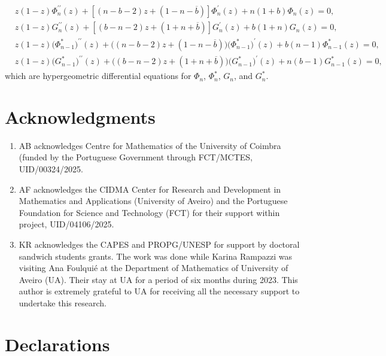 \documentclass[12pt]{amsart}
\begin{document}
\begin{align*}
&
z(1-z)\Phi_n^{\prime\prime}(z)+[(n-b-2)z+(1-n-\overline{b})]\Phi_n^{\prime}(z)+n(1+b)\Phi_n(z)=0,
 \\ 
&
z(1-z)G_n^{\prime\prime}(z)+[(b-n-2)z+(1+n+\overline{b})]G_n^{\prime}(z)+b(1+n)G_n(z)=0,\\
& 
 z(1-z) \big( \Phi_{n-1}^* \big)^{\prime\prime}(z)+\big((n-b-2)z+(1-n-\overline{b})\big) \big( \Phi_{n-1}^* \big)^{\prime}(z)+b(n-1)\Phi_{n-1}^*(z)=0,
 \\ 
&
 z(1-z) \big(G_{n-1}^*\big)^{\prime\prime}(z)+\big((b-n-2)z+(1+n+\overline{b})\big) \big( G_{n-1}^* \big)^{\prime}(z)+n(b-1)G_{n-1}^*(z)=0,
\end{align*}
which are hypergeometric differential equations for \( \Phi_n \), \( \Phi_n^* \), \( G_n \), and \( G_n^* \).





\section*{Acknowledgments}

\begin{enumerate}[\rm\( \bullet \)]
 \item
 AB
acknowledges Centre for Mathematics of the University of Coimbra 
(funded by the Portuguese Government through FCT/MCTES, %
UID/00324/2025.
\item
 AF
acknowledges the CIDMA Center for Research and Development in Mathematics and Applications
(University of Aveiro) and the Portuguese Foundation 
for Science and Technology (FCT) for their support within
project, 
UID/04106/2025.

\item
KR acknowledges the CAPES and PROPG/UNESP for support by doctoral sandwich students grants. The work was done while Karina Rampazzi was visiting Ana Foulqui\'e at the Department of Mathematics of University of Aveiro (UA). Their stay at UA for a period of six months during 2023. This author is extremely grateful to UA for receiving all the necessary support to undertake this research.

\end{enumerate}



\section*{Declarations}
\end{document}
